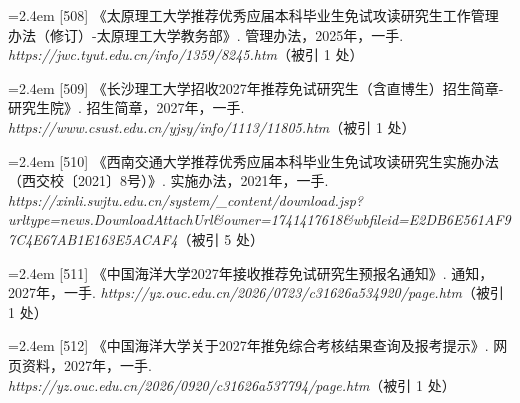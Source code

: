 {\vspace{0.6pt}
\vspace{3.5pt}\par
\nopagebreak\vspace{1pt}
\noindent\hangindent=2.4em \label{src:S0712}{\color{cAccent}[508]} 《太原理工大学推荐优秀应届本科毕业生免试攻读研究生工作管理办法（修订）-太原理工大学教务部》. 管理办法，2025年，一手. \textit{https://jwc.tyut.edu.cn/info/1359/8245.htm}（被引 1 处）\par
\vspace{0.6pt}
\vspace{3.5pt}\par
\nopagebreak\vspace{1pt}
\noindent\hangindent=2.4em \label{src:S0733}{\color{cAccent}[509]} 《长沙理工大学招收2027年推荐免试研究生（含直博生）招生简章-研究生院》. 招生简章，2027年，一手. \textit{https://www.csust.edu.cn/yjsy/info/1113/11805.htm}（被引 1 处）\par
\vspace{0.6pt}
\vspace{3.5pt}\par
\nopagebreak\vspace{1pt}
\noindent\hangindent=2.4em \label{src:S0738}{\color{cAccent}[510]} 《西南交通大学推荐优秀应届本科毕业生免试攻读研究生实施办法（西交校〔2021〕8号）》. 实施办法，2021年，一手. \textit{https://xinli.swjtu.edu.cn/system/\_content/download.jsp?urltype=news.DownloadAttachUrl\&owner=1741417618\&wbfileid=E2DB6E561AF97C4E67AB1E163E5ACAF4}（被引 5 处）\par
\vspace{0.6pt}
\vspace{3.5pt}\par
\nopagebreak\vspace{1pt}
\noindent\hangindent=2.4em \label{src:S0758}{\color{cAccent}[511]} 《中国海洋大学2027年接收推荐免试研究生预报名通知》. 通知，2027年，一手. \textit{https://yz.ouc.edu.cn/2026/0723/c31626a534920/page.htm}（被引 1 处）\par
\vspace{0.6pt}
\noindent\hangindent=2.4em \label{src:S0759}{\color{cAccent}[512]} 《中国海洋大学关于2027年推免综合考核结果查询及报考提示》. 网页资料，2027年，一手. \textit{https://yz.ouc.edu.cn/2026/0920/c31626a537794/page.htm}（被引 1 处）\par
}
